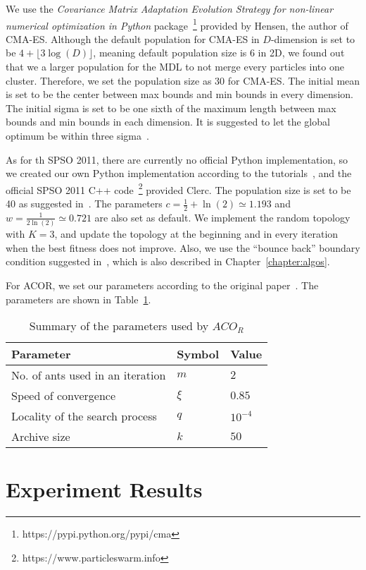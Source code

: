 We use the \textit{Covariance Matrix Adaptation Evolution Strategy for non-linear numerical optimization in Python} package~\footnote{https://pypi.python.org/pypi/cma} provided by Hensen, the author of CMA-ES.
Although the default population for CMA-ES in $D$-dimension is set to be $4 + \lfloor3\log(D)\rfloor$, meaning default population size is 6 in 2D,
we found out that we a larger population for the MDL to not merge every particles into one cluster.
Therefore, we set the population size as 30 for CMA-ES.
The initial mean is set to be the center between max bounds and min bounds in every dimension.
The initial sigma is set to be one sixth of the maximum length between max bounds and min bounds in each dimension. 
It is suggested to let the global optimum be within three sigma~\cite{Hansen:2006:CMA_ES_review}.

As for th SPSO 2011, there are currently no official Python implementation, 
so we created our own Python implementation according to the tutorials~\cite{Clerc:2012:SPSO2011},
and the official SPSO 2011 C++ code~\footnote{https://www.particleswarm.info} provided Clerc.
The population size is set to be 40 as suggested in~\cite{Clerc:2012:SPSO2011}.
The parameters $c = \frac{1}{2} + \ln(2) \simeq 1.193$ and $w = \frac{1}{2\ln(2)} \simeq 0.721$ are also set as default.
We implement the random topology with $K = 3$,
and update the topology at the beginning and in every iteration when the best fitness does not improve.
Also, we use the ``bounce back'' boundary condition suggested in~\cite{Clerc:2012:SPSO2011}, which is also described in Chapter~\ref{chapter:algos}.

For ACOR, we set our parameters according to the original paper~\cite{Socha:2008:ACOR}. 
The parameters are shown in Table~\ref{table:ACOR_parameters}.

\begin{table}%
\centering
\label{table:ACOR_parameters}
\begin{tabular}{lll}
\hline
Parameter                        & Symbol   & Value          \\ \hline
No. of ants used in an iteration & $m$      & $2$            \\
Speed of convergence             & $\xi$    & $0.85$         \\
Locality of the search process   & $q$      & $10^{-4}$      \\
Archive size                     & $k$      & $50$           \\ \hline
\end{tabular}
\caption{Summary of the parameters used by $ACO_R$}
\end{table}


\section{Experiment Results}
